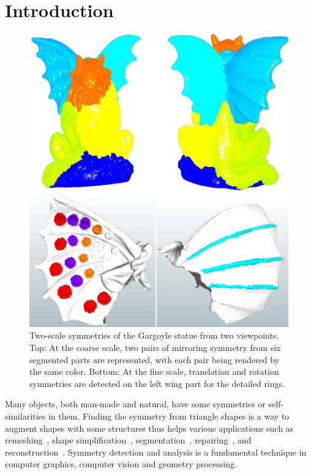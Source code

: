 \section{Introduction}
\label{sec:intro}

\begin{figure}[t]
\centering
  \includegraphics[width=0.99\linewidth]{figures/Gargoyl.pdf}
  \caption{Two-scale symmetries of the Gargoyle statue from two viewpoints.
  Top: At the coarse scale, two pairs of mirroring symmetry from six segmented parts are represented, with each pair being rendered by the same color.
  Bottom: At the fine scale, translation and rotation symmetries are detected on the left wing part for the detailed rings.}
\label{fig:Gargoyl}
\end{figure}

Many objects, both man-made and natural, have some symmetries or self-similarities in them.
Finding the symmetry from triangle shapes is a way to augment shapes with some structures thus helps various applications such as remeshing~\cite{podolak2006}, shape simplification~\cite{pauly2008},
segmentation~\cite{Shamir2008,mitra2006,xu2009}, repairing~\cite{bokeloh2009,berner2011}, and reconstruction~\cite{zabrodsky1997}.
Symmetry detection and analysis is a fundamental technique in computer graphics, computer vision and geometry processing.

